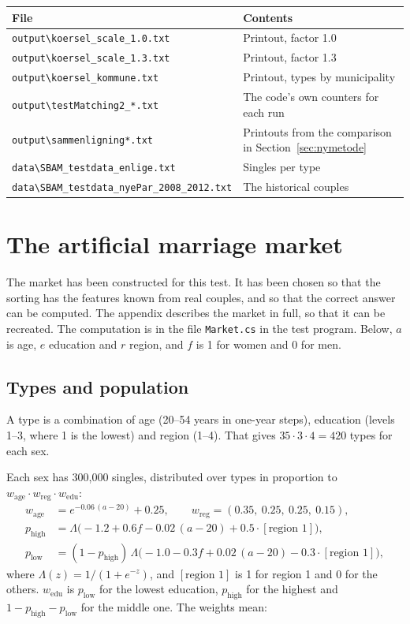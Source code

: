 \documentclass[12pt,a4paper]{article}
\newcommand{\kode}[1]{\texttt{#1}}
\begin{document}
\begin{center}
\begin{tabular}{@{}ll@{}}
\toprule
File & Contents \\
\midrule
\kode{output\textbackslash koersel\_scale\_1.0.txt} & Printout, factor 1.0 \\
\kode{output\textbackslash koersel\_scale\_1.3.txt} & Printout, factor 1.3 \\
\kode{output\textbackslash koersel\_kommune.txt} & Printout, types by municipality \\
\kode{output\textbackslash testMatching2\_*.txt} & The code's own counters for each run \\
\kode{output\textbackslash sammenligning*.txt} & Printouts from the comparison in Section~\ref{sec:nymetode} \\
\kode{data\textbackslash SBAM\_testdata\_enlige.txt} & Singles per type \\
\kode{data\textbackslash SBAM\_testdata\_nyePar\_2008\_2012.txt} & The historical couples \\
\bottomrule
\end{tabular}
\end{center}


\appendix
\section{The artificial marriage market}\label{app:parametre}

The market has been constructed for this test. It has been chosen so that the sorting has the
features known from real couples, and so that the correct answer can be computed. The appendix
describes the market in full, so that it can be recreated. The computation is in the file
\kode{Market.cs} in the test program. Below, $a$ is age, $e$ education and $r$ region, and $f$ is 1
for women and 0 for men.

\subsection{Types and population}

A type is a combination of age (20--54 years in one-year steps), education (levels 1--3, where 1 is
the lowest) and region (1--4). That gives $35\cdot3\cdot4=420$ types for each sex.

Each sex has 300,000 singles, distributed over types in proportion to
$w_{\text{age}}\cdot w_{\text{reg}}\cdot w_{\text{edu}}$:
\begin{align*}
w_{\text{age}} &= e^{-0.06\,(a-20)}+0.25, \qquad w_{\text{reg}} = (0.35,\ 0.25,\ 0.25,\ 0.15),\\
p_{\text{high}} &= \Lambda\bigl(-1.2+0.6f-0.02\,(a-20)+0.5\cdot[\text{region 1}]\bigr),\\
p_{\text{low}} &= (1-p_{\text{high}})\,\Lambda\bigl(-1.0-0.3f+0.02\,(a-20)-0.3\cdot[\text{region 1}]\bigr),
\end{align*}
where $\Lambda(z)=1/(1+e^{-z})$, and $[\text{region 1}]$ is 1 for region 1 and 0 for the others.
$w_{\text{edu}}$ is $p_{\text{low}}$ for the lowest education, $p_{\text{high}}$ for the highest and
$1-p_{\text{high}}-p_{\text{low}}$ for the middle one. The weights mean:
\end{document}
